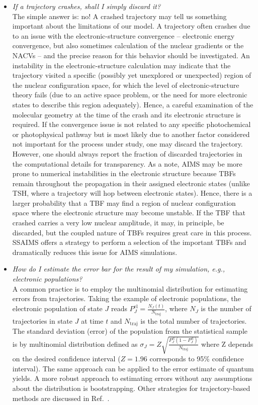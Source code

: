 \documentclass[9pt,bestpractices,pubversion]{livecoms}
\begin{document}
\begin{itemize}
\item{\textit{If a trajectory crashes, shall I simply discard it?} \\
The simple answer is: no! A crashed trajectory may tell us something important about the limitations of our model. A trajectory often crashes due to an issue with the electronic-structure convergence -- electronic energy convergence, but also sometimes calculation of the nuclear gradients or the NACVs -- and the precise reason for this behavior should be investigated. An instability in the electronic-structure calculation may indicate that the trajectory visited a specific (possibly yet unexplored or unexpected) region of the nuclear configuration space, for which the level of electronic-structure theory fails (due to an active space problem, or the need for more electronic states to describe this region adequately). Hence, a careful examination of the molecular geometry at the time of the crash and its electronic structure is required. If the convergence issue is not related to any specific photochemical or photophysical pathway but is most likely due to another factor considered not important for the process under study, one may discard the trajectory. However, one should always report the fraction of discarded trajectories in the computational details for transparency. As a note, AIMS may be more prone to numerical instabilities in the electronic structure because TBFs remain throughout the propagation in their assigned electronic states (unlike TSH, where a trajectory will hop between electronic states). Hence, there is a larger probability that a TBF may find a region of nuclear configuration space where the electronic structure may become unstable. If the TBF that crashed carries a very low nuclear amplitude, it may, in principle, be discarded, but the coupled nature of TBFs requires great care in this process. SSAIMS offers a strategy to perform a selection of the important TBFs and dramatically reduces this issue for AIMS simulations.\cite{curchod2020ssaims,ibele2021ssaims}
}

\item{\textit{How do I estimate the error bar for the result of my simulation, e.g., electronic populations?} \\
A common practice is to employ the multinomial distribution for estimating errors from trajectories. Taking the example of electronic populations, the electronic population of state $J$ reads $P^\mathrm{el}_J = \frac{N_J(t)}{N_\mathrm{traj}}$, where $N_J$ is the number of trajectories in state $J$ at time $t$ and $N_\mathrm{traj}$ is the total number of trajectories. The standard deviation (error) of the population from the statistical sample is by multinomial distribution defined as $\sigma_J = Z\sqrt{\frac{P^\mathrm{el}_J (1-P^\mathrm{el}_J)}{N_\mathrm{traj}}}$ where Z depends on the desired confidence interval ($Z=1.96$ corresponds to 95\% confidence interval). The same approach can be applied to the error estimate of quantum yields. A more robust approach to estimating errors without any assumptions about the distribution is bootstrapping. Other strategies for trajectory-based methods are discussed in Ref.~.  

}
\end{itemize}
\end{document}
